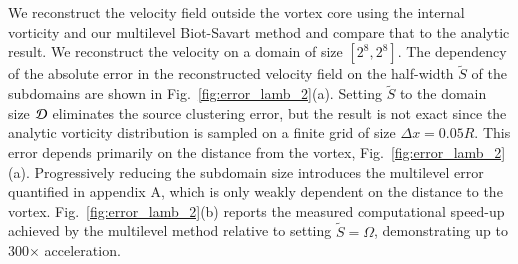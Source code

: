\documentclass[final,1p,times]{elsarticle}
\begin{document}
We reconstruct the velocity field outside the vortex core using the internal vorticity and our multilevel Biot-Savart method and compare that to the analytic result. We reconstruct the velocity on a domain of size $[2^8,2^8]$. The dependency of the absolute error in the reconstructed velocity field on the half-width $\tilde S$ of the subdomains are shown in Fig.~\ref{fig:error_lamb_2}(a). Setting $\tilde S$ to the domain size $\cal D$ eliminates the source clustering error, but the result is not exact since the analytic vorticity distribution is sampled on a finite grid of size $\Delta x=0.05
R$. This error depends primarily on the distance from the vortex, Fig.~\ref{fig:error_lamb_2}(a). Progressively reducing the subdomain size introduces the multilevel error quantified in appendix A, which is only weakly dependent on the distance to the vortex. Fig.~\ref{fig:error_lamb_2}(b) reports the measured computational speed-up achieved by the multilevel method relative to setting $\tilde S=\Omega$, demonstrating up to 300$\times$ acceleration.
\end{document}

